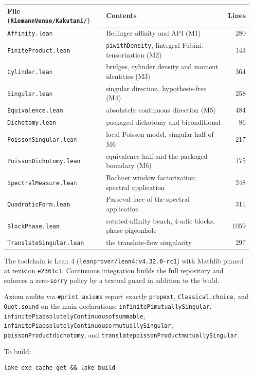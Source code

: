 \documentclass[a4paper,UKenglish,autoref,thm-restate]{lipics-v2021}
\newcommand{\leanid}[1]{{\def\_{\textunderscore\allowbreak}\texttt{#1}}}
\begin{document}
\begin{center}
\small
\begin{tabular}{@{}llr@{}}
\toprule
File (\texttt{RiemannVenue/Kakutani/}) & Contents & Lines \\
\midrule
\texttt{Affinity.lean} & Hellinger affinity and API (M1) & 280 \\
\texttt{FiniteProduct.lean} & \leanid{pi\_withDensity}, lintegral Fubini, tensorization (M2) & 143 \\
\texttt{Cylinder.lean} & bridges, cylinder density and moment identities (M3) & 364 \\
\texttt{Singular.lean} & singular direction, hypothesis-free (M4) & 258 \\
\texttt{Equivalence.lean} & absolutely continuous direction (M5) & 484 \\
\texttt{Dichotomy.lean} & packaged dichotomy and biconditional & 86 \\
\texttt{PoissonSingular.lean} & local Poisson model, singular half of M6 & 217 \\
\texttt{PoissonDichotomy.lean} & equivalence half and the packaged boundary (M6) & 175 \\
\texttt{SpectralMeasure.lean} & Bochner window factorization; spectral application & 248 \\
\texttt{QuadraticForm.lean} & Parseval face of the spectral application & 311 \\
\texttt{BlockPhase.lean} & rotated-affinity bench, 4-adic blocks, phase pigeonhole & 1059 \\
\texttt{TranslateSingular.lean} & the translate-flow singularity & 297 \\
\bottomrule
\end{tabular}
\end{center}

The toolchain is Lean 4 (\texttt{leanprover/lean4:v4.32.0-rc1}) with Mathlib
pinned at revision \texttt{e2361c1}. Continuous integration builds the full
repository and enforces a zero-\texttt{sorry} policy by a textual guard in
addition to the build. {\sloppy Axiom audits via \leanid{\#print axioms}
report exactly \leanid{propext}, \leanid{Classical.choice}, and
\leanid{Quot.sound} on the main declarations:
\leanid{infinitePi\_mutuallySingular},
\leanid{infinitePi\_absolutelyContinuous\_of\_summable},
\leanid{infinitePi\_absolutelyContinuous\_or\_mutuallySingular},
\leanid{poissonProduct\_dichotomy}, and
\leanid{translate\_poissonProduct\_mutuallySingular}.\par} To build:
\begin{lstlisting}[language={}]
lake exe cache get && lake build
\end{lstlisting}
\end{document}
